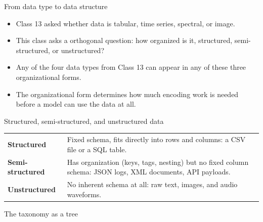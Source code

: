 \begin{frame}{From data type to data structure}
\begin{itemize}
\item Class 13 asked whether data is tabular, time series, spectral, or image.
\item This class asks a orthogonal question: how organized is it, structured, semi-structured, or unstructured?
\item Any of the four data types from Class 13 can appear in any of these three organizational forms.
\item The organizational form determines how much encoding work is needed before a model can use the data at all.
\end{itemize}
\coursefooter
\end{frame}

\begin{frame}{Structured, semi-structured, and unstructured data}
\begin{tabularx}{\textwidth}{>{\bfseries}l X}
Structured & Fixed schema, fits directly into rows and columns: a CSV file or a SQL table. \\
Semi-structured & Has organization (keys, tags, nesting) but no fixed column schema: JSON logs, XML documents, API payloads. \\
Unstructured & No inherent schema at all: raw text, images, and audio waveforms. \\
\end{tabularx}
\coursefooter
\end{frame}

\begin{frame}{The taxonomy as a tree}
\centering
{}
\coursefooter
\end{frame}

